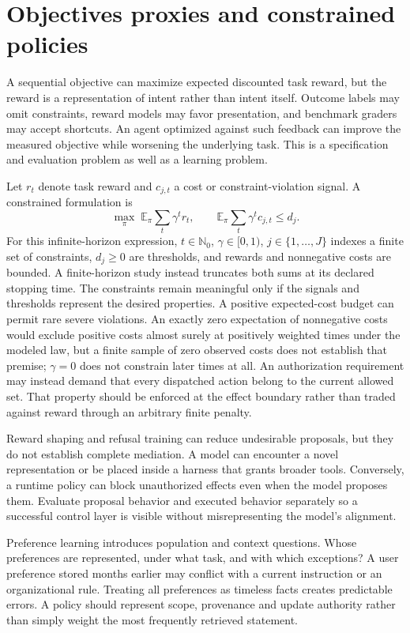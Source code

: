 \section{Objectives proxies and constrained policies}\label{sec:C29:objectives}
A sequential objective can maximize expected discounted task reward, but the reward is a representation of intent rather than intent itself. Outcome labels may omit constraints, reward models may favor presentation, and benchmark graders may accept shortcuts. An agent optimized against such feedback can improve the measured objective while worsening the underlying task. This is a specification and evaluation problem as well as a learning problem.

Let $r_t$ denote task reward and $c_{j,t}$ a cost or constraint-violation signal. A constrained formulation is
\begin{equation}
 \max_{\pi}\;\mathbb E_\pi\sum_t\gamma^t r_t,
 \qquad
 \mathbb E_\pi\sum_t\gamma^t c_{j,t}\leq d_j.
\end{equation}
For this infinite-horizon expression, $t\in\mathbb N_0$, $\gamma\in[0,1)$, $j\in\{1,\ldots,J\}$ indexes a finite set of constraints, $d_j\geq0$ are thresholds, and rewards and nonnegative costs are bounded. A finite-horizon study instead truncates both sums at its declared stopping time. The constraints remain meaningful only if the signals and thresholds represent the desired properties. A positive expected-cost budget can permit rare severe violations. An exactly zero expectation of nonnegative costs would exclude positive costs almost surely at positively weighted times under the modeled law, but a finite sample of zero observed costs does not establish that premise; $\gamma=0$ does not constrain later times at all. An authorization requirement may instead demand that every dispatched action belong to the current allowed set. That property should be enforced at the effect boundary rather than traded against reward through an arbitrary finite penalty.

Reward shaping and refusal training can reduce undesirable proposals, but they do not establish complete mediation. A model can encounter a novel representation or be placed inside a harness that grants broader tools. Conversely, a runtime policy can block unauthorized effects even when the model proposes them. Evaluate proposal behavior and executed behavior separately so a successful control layer is visible without misrepresenting the model's alignment.

Preference learning introduces population and context questions. Whose preferences are represented, under what task, and with which exceptions? A user preference stored months earlier may conflict with a current instruction or an organizational rule. Treating all preferences as timeless facts creates predictable errors. A policy should represent scope, provenance and update authority rather than simply weight the most frequently retrieved statement.

